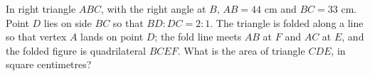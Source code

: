 In right triangle $ABC$, with the right angle at $B$, $AB=44$ cm and $BC=33$ cm. Point $D$ lies on side $BC$ so that $BD:DC=2:1$. The triangle is folded along a line so that vertex $A$ lands on point $D$; the fold line meets $AB$ at $F$ and $AC$ at $E$, and the folded figure is quadrilateral $BCEF$. What is the area of triangle $CDE$, in square centimetres?
